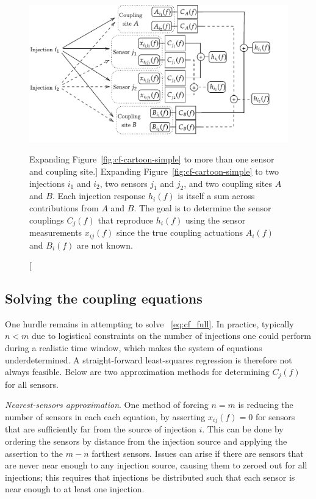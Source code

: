 \begin{figure}[h]
	\includegraphics[width=\textwidth]{figures/noise-methods/cf-cartoon-full.pdf}
	\caption
	[Expanding Figure~\ref{fig:cf-cartoon-simple} to more than one sensor and coupling site.]
	{
		Expanding Figure~\ref{fig:cf-cartoon-simple} to two injections $i_1$ and $i_2$, two sensors $j_1$ and $j_2$, and two coupling sites $A$ and $B$.
		Each injection response $h_i(f)$ is itself a sum across contributions from $A$ and $B$.
		The goal is to determine the sensor couplings $C_j(f)$ that reproduce $h_i(f)$ using the sensor measurements $x_{ij}(f)$ since the true coupling actuations $A_i(f)$ and $B_i(f)$ are not known.
	}
	\label{fig:cf-cartoon-full}
\end{figure}

\subsection{Solving the coupling equations}

One hurdle remains in attempting to solve ~\cref{eq:cf_full}.
In practice, typically $n<m$ due to logistical constraints on the number of injections one could perform during a realistic time window, which makes the system of equations underdetermined.
A straight-forward least-squares regression is therefore not always feasible.
Below are two approximation methods for determining $C_j(f)$ for all sensors.

\textit{Nearest-sensors approximation}.
One method of forcing $n=m$ is reducing the number of sensors in each each equation, by asserting $x_{ij}(f)=0$ for sensors that are sufficiently far from the source of injection $i$.
This can be done by ordering the sensors by distance from the injection source and applying the assertion to the $m-n$ farthest sensors.
Issues can arise if there are sensors that are never near enough to any injection source, causing them to zeroed out for all injections; this requires that injections be distributed such that each sensor is near enough to at least one injection.

